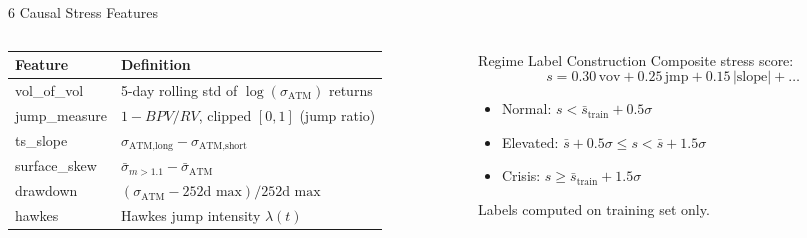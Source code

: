\documentclass[aspectratio=169,10pt]{beamer}
\begin{document}
\begin{frame}{6 Causal Stress Features}
  \begin{columns}[T]
    \begin{column}{0.50\textwidth}
      \scriptsize
      \begin{tabular}{lp{5.0cm}}
        \toprule
        \textbf{Feature} & \textbf{Definition} \\
        \midrule
        vol\_of\_vol   & 5-day rolling std of $\log(\sigma_\text{ATM})$ returns \\
        jump\_measure  & $1-BPV/RV$, clipped $[0,1]$ (jump ratio) \\
        ts\_slope      & $\sigma_\text{ATM,long}-\sigma_\text{ATM,short}$ \\
        surface\_skew  & $\bar{\sigma}_{m>1.1}-\bar{\sigma}_\text{ATM}$ \\
        drawdown       & $(\sigma_\text{ATM}-\text{252d max})/\text{252d max}$ \\
        hawkes         & Hawkes jump intensity $\lambda(t)$ \\
        \bottomrule
      \end{tabular}
    \end{column}
    \begin{column}{0.47\textwidth}
      \begin{block}{Regime Label Construction}
        \footnotesize
        Composite stress score:
        \[
          s=0.30\,\text{vov}+0.25\,\text{jmp}+0.15\,|\text{slope}|+\ldots
        \]
        \begin{itemize}\itemsep2pt
          \item Normal: $s<\bar{s}_\text{train}+0.5\sigma$
          \item Elevated: $\bar{s}+0.5\sigma\le s<\bar{s}+1.5\sigma$
          \item Crisis: $s\ge\bar{s}_\text{train}+1.5\sigma$
        \end{itemize}
        Labels computed on training set only.
      \end{block}
    \end{column}
  \end{columns}
\end{frame}
\end{document}
